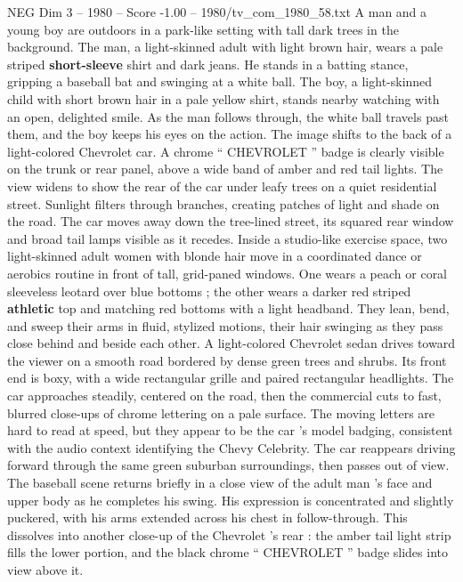 \begin{textsample}{NEG Dim 3 – 1980 – Score -1.00 – 1980/tv\_com\_1980\_58.txt}  \label{ex:f3_neg_057}
A man and a young boy are outdoors in a park-like setting with tall dark trees in the background.
The man, a light-skinned adult with light brown hair, wears a pale striped \textbf{short-sleeve} shirt and dark jeans.
He stands in a batting stance, gripping a baseball bat and swinging at a white ball.
The boy, a light-skinned child with short brown hair in a pale yellow shirt, stands nearby watching with an open, delighted smile.
As the man follows through, the white ball travels past them, and the boy keeps his eyes on the action.
The image shifts to the back of a light-colored Chevrolet car.
A chrome “ CHEVROLET ” badge is clearly visible on the trunk or rear panel, above a wide band of amber and red tail lights.
The view widens to show the rear of the car under leafy trees on a quiet residential street.
Sunlight filters through branches, creating patches of light and shade on the road.
The car moves away down the tree-lined street, its squared rear window and broad tail lamps visible as it recedes.
Inside a studio-like exercise space, two light-skinned adult women with blonde hair move in a coordinated dance or aerobics routine in front of tall, grid-paned windows.
One wears a peach or coral sleeveless leotard over blue bottoms ; the other wears a darker red striped \textbf{athletic} top and matching red bottoms with a light headband.
They lean, bend, and sweep their arms in fluid, stylized motions, their hair swinging as they pass close behind and beside each other.
A light-colored Chevrolet sedan drives toward the viewer on a smooth road bordered by dense green trees and shrubs.
Its front end is boxy, with a wide rectangular grille and paired rectangular headlights.
The car approaches steadily, centered on the road, then the commercial cuts to fast, blurred close-ups of chrome lettering on a pale surface.
The moving letters are hard to read at speed, but they appear to be the car ’s model badging, consistent with the audio context identifying the Chevy Celebrity.
The car reappears driving forward through the same green suburban surroundings, then passes out of view.
The baseball scene returns briefly in a close view of the adult man ’s face and upper body as he completes his swing.
His expression is concentrated and slightly puckered, with his arms extended across his chest in follow-through.
This dissolves into another close-up of the Chevrolet ’s rear : the amber tail light strip fills the lower portion, and the black chrome “ CHEVROLET ” badge slides into view above it.

\end{textsample}
